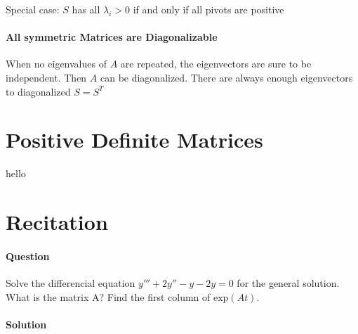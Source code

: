 \documentclass{article}
\begin{document}
Special case: $S$ has all $\lambda_i>0$ if and only if all pivots are positive

\paragraph{All symmetric Matrices are Diagonalizable}

When no eigenvalues of $A$ are repeated, the eigenvectors are sure to be independent. Then $A$ can be diagonalized. There are always enough eigenvectors to diagonalized $S=S^T$

\newpage

\section{Positive Definite Matrices}

hello

\section{Recitation}

\paragraph{Question}

Solve the differencial equation $y'''+2y''-y-2y=0$ for the general solution. What is the matrix A?
Find the first column of $\text{exp}(At)$.

\paragraph{Solution}
\end{document}
